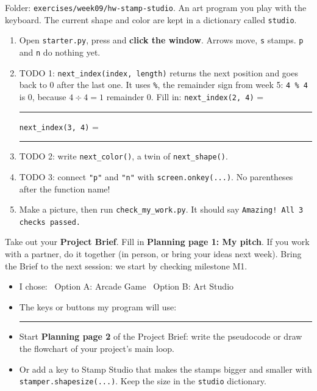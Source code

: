 \namedateline

\begin{core}
Folder: \texttt{exercises/week09/hw-stamp-studio}. An art program you play with the keyboard. The current shape and color are kept in a
dictionary called \texttt{studio}.
\begin{enumerate}[leftmargin=1.4em]
  \item Open \texttt{starter.py}, press  and \textbf{click the window}. Arrows move, \texttt{s} stamps. \texttt{p} and \texttt{n} do nothing yet.
  \item TODO 1: \texttt{next\_index(index, length)} returns the next position and goes back to 0 after the last one.
        It uses \texttt{\%}, the remainder sign from week 5: \texttt{4 \% 4} is 0, because $4 \div 4 = 1$ remainder 0. Fill in:
        \texttt{next\_index(2, 4)} = \rule{1cm}{0.4pt} \quad \texttt{next\_index(3, 4)} = \rule{1cm}{0.4pt}
  \item TODO 2: write \texttt{next\_color()}, a twin of \texttt{next\_shape()}.
  \item TODO 3: connect \texttt{"p"} and \texttt{"n"} with \texttt{screen.onkey(...)}. No parentheses after the function name!
  \item Make a picture, then run \texttt{check\_my\_work.py}. It should say \texttt{Amazing! All 3 checks passed.}
\end{enumerate}
\end{core}

\begin{core}
Take out your \textbf{Project Brief}. Fill in \textbf{Planning page 1: My pitch}. If you work with a partner, do it together (in person, or bring your
ideas next week). Bring the Brief to the next session: we start by checking milestone M1.
\begin{itemize}[leftmargin=1.2em]
  \item I chose: \tickbox\ Option A: Arcade Game \qquad \tickbox\ Option B: Art Studio
  \item The keys or buttons my program will use: \rule{7cm}{0.4pt}
\end{itemize}
\end{core}

\begin{challenge}
\begin{itemize}[leftmargin=1.2em]
  \item Start \textbf{Planning page 2} of the Project Brief: write the pseudocode or draw the flowchart of your project's main loop.
  \item Or add a key to Stamp Studio that makes the stamps bigger and smaller with \texttt{stamper.shapesize(...)}. Keep the size in the \texttt{studio} dictionary.
\end{itemize}
\end{challenge}

